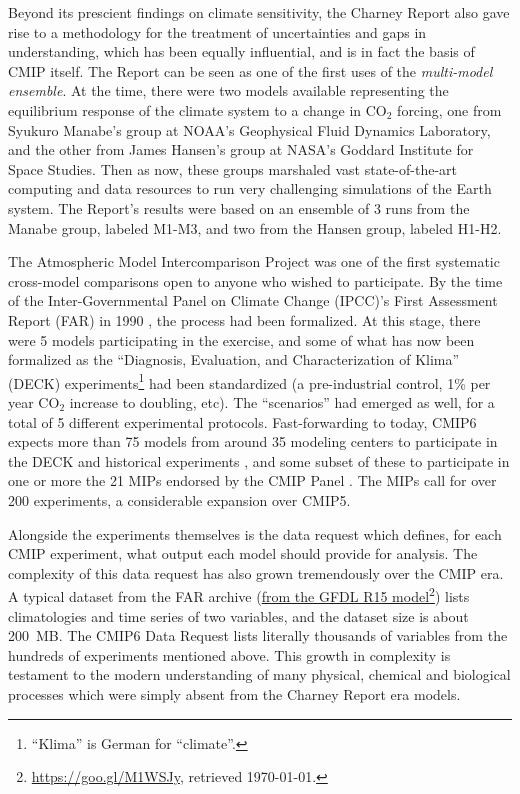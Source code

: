 \documentclass[gmd,manuscript]{copernicus}
\newcommand{\pllabel}[1]{\label{p-#1}\linelabel{l-#1}}
\newcommand{\urlref}[2] {\href{#1}{#2}\footnote{\url{#1}, retrieved \today.}}
\begin{document}
Beyond its prescient findings on climate sensitivity, the Charney
Report also gave rise to a methodology for the treatment of
uncertainties and gaps in understanding, which has been equally
influential, and is in fact the basis of CMIP itself. The Report can
be seen as one of the first uses of the \emph{multi-model ensemble}.
At the time, there were two models available
\pllabel{RC1-3}
representing the equilibrium response of the climate system to a
change in CO$_2$ forcing, one from Syukuro Manabe's group at NOAA's
Geophysical Fluid Dynamics Laboratory, and the other from James
Hansen's group at NASA's Goddard Institute for Space Studies. Then as
now, these groups marshaled vast state-of-the-art computing and data
resources to run very challenging simulations of the Earth system. The
Report's results were based on an ensemble of 3 runs from the Manabe
group,
\pllabel{RC1-4}
labeled M1-M3, and two from the Hansen group, 
\pllabel{RC1-5}
labeled H1-H2.

The Atmospheric Model Intercomparison Project
\citep[AMIP:][]{ref:gates1992} was one of the first systematic
cross-model comparisons open to anyone who wished to participate.
\pllabel{RC1-6}
By the time of the Inter-Governmental Panel on Climate Change (IPCC)'s
First Assessment Report (FAR) in 1990 \citep{ref:houghtonetal1992},
\pllabel{RC1-9}
the process had been formalized. At this stage, there were 5 models
participating in the exercise, and some of what has now been
formalized as the ``Diagnosis, Evaluation, and Characterization of
Klima'' (DECK) experiments\footnote{``Klima'' is German for
  ``climate''.} had been standardized (a pre-industrial control, 1\%
per year CO$_2$ increase to doubling, etc). The ``scenarios'' had
emerged as well, for a total of 5 different experimental protocols.
Fast-forwarding to today, CMIP6 expects more than 75 models from
around 35 modeling centers \citep[in 14 countries, a stark contrast
to the US monopoly in][]{ref:charneyetal1979} to participate in the
DECK and historical experiments \citep[Table~2
of][]{ref:eyringetal2016a}, and some subset of these to participate in
one or more the 21 MIPs endorsed by the CMIP Panel \citep[Table~3
of][, now 23 with two new endorsed MIPs since]{ref:eyringetal2016a}.
\pllabel{RC1-7}
The MIPs call for over 200 experiments, a considerable expansion over
CMIP5.

Alongside the experiments themselves is the data request which
defines, for each CMIP experiment, what output each model should
provide for analysis. The complexity of this data request has also
grown tremendously over the CMIP era. A typical dataset from the FAR
archive (\urlref{https://goo.gl/M1WSJy}{from the GFDL R15 model}) lists
climatologies and time series of two variables, and the dataset size
is about 200~MB. The CMIP6 Data Request \cite{ref:juckesetal2015}
lists literally thousands of variables from the hundreds of
experiments mentioned above. This growth in complexity is testament to
the modern understanding of many physical, chemical and biological
processes which were simply absent from the Charney Report era models.
\end{document}
